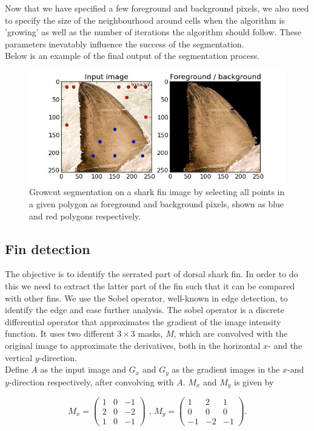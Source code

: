 \documentclass[a4paper,10pt]{article}
\begin{document}
Now that we have specified a few foreground and background pixels, we also need
to specify the size of the neighbourhood around cells when the algorithm is
'growing' as well as the number of iterations the algorithm should follow. 
These parameters inevatably influence the success of the segmentation.
\\

Below is an example of the final output of the segmentation process. \\

\begin{figure}[H]
 \centering
 \includegraphics[width=5in]{segmentation.jpg}
 \caption{Growcut segmentation on a shark fin image by selecting all points in a
given polygon as foreground and background pixels, shown as blue and red
 polygons respectively.}
 \label{segmentation1}
\end{figure}


\subsection{Fin detection}
The objective is to identify the serrated part of dorsal shark fin. In order to
do this we need to extract the latter part of the fin such that it can be
compared with other fins.  We use the Sobel operator, well-known in edge
detection, to identify the edge and ease further analysis.  
The sobel operator is a discrete differential operator that approximates the
gradient of the image intensity function.
It uses two different $3 \times 3$ masks, $M$, which are convolved with the
original image to approximate the derivatives, both in the horizontal $x$-
and the vertical $y$-direction.  \\

Define $A$ as the input image and $G_x$ and $G_y$ as the gradient images in the
$x$-and $y$-direction respectively,
after convolving with $A$.  $M_x$ and $M_y$ is given by

\[
 M_x = \begin{pmatrix*}
        1 & 0 & -1 \\
        2 & 0 & -2 \\
        1 & 0 & -1
       \end{pmatrix*}
\mbox{ , }
 M_y = \begin{pmatrix*}
        1 & 2 & 1 \\
        0 & 0 & 0 \\
        -1 & -2 & -1
       \end{pmatrix*}
.\]
\end{document}
